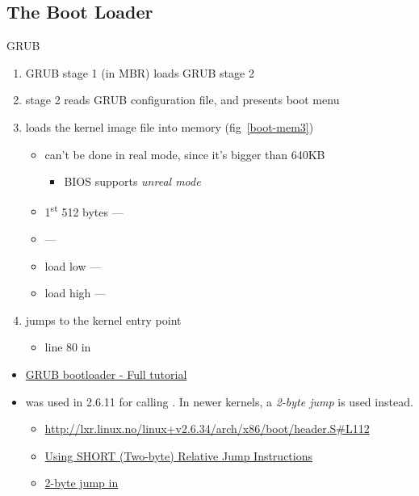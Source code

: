 \subsection{The Boot Loader}
\label{sec:boot-loader}

\begin{frame}{GRUB}
  \begin{enumerate}
  \item GRUB stage 1 (in MBR) loads GRUB stage 2
  \item stage 2 reads GRUB configuration file, and presents boot menu
  \item loads the kernel image file into memory (fig~\ref{boot-mem3})
    \begin{itemize}
    \item can't be done in real mode, since it's bigger than 640KB
      \begin{itemize}
      \item BIOS supports \emph{unreal mode}
      \end{itemize}
    \item 1\textsuperscript{st} 512 bytes --- 
    \item {} --- 
    \item load low --- 
    \item load high --- 
    \end{itemize}
  \item \alert{jumps to the kernel entry point}
    \begin{itemize}
    \item line 80 in 
      \begin{center}
      \end{center}
    \end{itemize}
  \end{enumerate}
\end{frame}

\begin{itemize}
\item \href{http://www.dedoimedo.com/computers/grub.html}{GRUB bootloader - Full tutorial}
\item {} was used in 2.6.11 for calling . In
  newer kernels, a \emph{2-byte jump} is used instead.
  \begin{itemize}
  \item \url{http://lxr.linux.no/linux+v2.6.34/arch/x86/boot/header.S#L112}
  \item \href{http://thestarman.pcministry.com/asm/2bytejumps.htm}{Using SHORT (Two-byte)
      Relative Jump Instructions}
  \item \href{http://www.groad.net/bbs/read.php?tid-3001.html}{2-byte jump in }
  \end{itemize}
\end{itemize}

